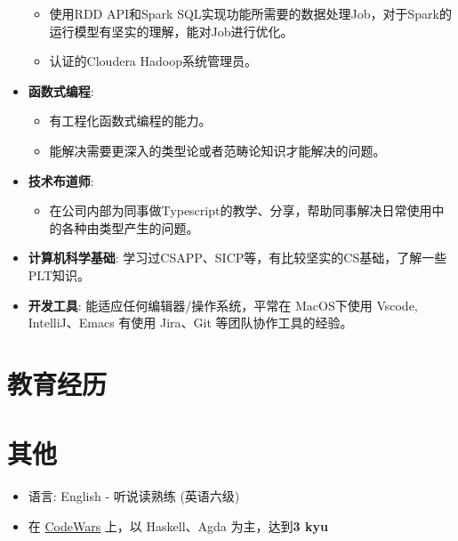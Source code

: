 \documentclass{resume}
\begin{document}
\begin{itemize}[parsep=0.25ex]
\begin{itemize}[parsep=0.25ex]
\item 使用RDD API和Spark SQL实现功能所需要的数据处理Job，对于Spark的运行模型有坚实的理解，能对Job进行优化。
\item 认证的Cloudera Hadoop系统管理员。
\end{itemize}
\item
\textbf{函数式编程}:
\begin{itemize}[parsep=0.25ex]
\item 有工程化函数式编程的能力。
\item 能解决需要更深入的类型论或者范畴论知识才能解决的问题。
\end{itemize}
\item
\textbf{技术布道师}:
\begin{itemize}[parsep=0.25ex]
\item 在公司内部为同事做Typescript的教学、分享，帮助同事解决日常使用中的各种由类型产生的问题。
\end{itemize}
\item
\textbf{计算机科学基础}:
学习过CSAPP、SICP等，有比较坚实的CS基础，了解一些PLT知识。
\item
\textbf{开发工具}:
能适应任何编辑器/操作系统，平常在 MacOS下使用 Vscode, IntelliJ、Emacs
有使用 Jira、Git 等团队协作工具的经验。
\end{itemize}
\section{教育经历}
\section{其他}
\begin{itemize}[parsep=0.25ex]
\item 语言: English - 听说读熟练 (英语六级)
\item 在 \href{https://www.codewars.com/users/GreyPlane}{CodeWars} 上，以 Haskell、Agda 为主，达到\textbf{3 kyu}
\end{itemize}
\end{document}
